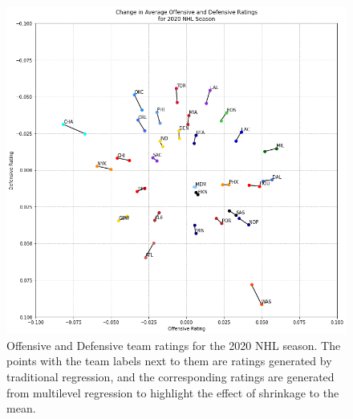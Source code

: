 \documentclass{uofsthesis-cs}
\begin{document}
\begin{appendices}
\begin{figure}
	\includegraphics[width=\textwidth]{figures/nba_ratings2.png}
	\caption{Offensive and Defensive team ratings for the 2020 NHL season. The points with the team labels next to them are ratings generated by traditional regression, and the corresponding ratings are generated from multilevel regression to highlight the effect of shrinkage to the mean.}
\end{figure}


\end{appendices}
\end{document}
